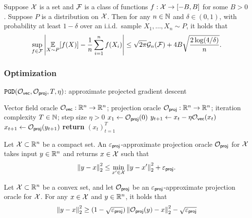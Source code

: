 \begin{lemma} \label{lem:unif-conv}
  Suppose $\mathcal{X}$ is a set and $\mathcal{F}$ is a class of functions $f : \mathcal{X} \to [-B, B]$ for some $B > 0$. Suppose $P$ is a distribution on $\mathcal{X}$. Then for any $n \in \mathbb{N}$ and $\delta \in (0,1)$, with probability at least $1-\delta$ over an i.i.d.~sample $X_1, \ldots, X_n \sim P$, it holds that\loose
  \begin{align}
\sup_{f \in \mathcal{F}} \left| \operatorname*{\mathbb{E}}_{X \sim P}[f(X)] - \frac 1n \sum_{i=1}^n f(X_i) \right| \leq \sqrt{2\pi}\mathcal{G}_n(\mathcal{F}) + 4B\sqrt{\frac{2 \log(4/\delta)}{n}}.\nonumber
  \end{align}
\end{lemma}

\subsubsection{Optimization}

\begin{algorithm}
\caption{$\texttt{PGD}(\mathcal{O}_{\mathsf{vec}},\mathcal{O}_{\mathsf{proj}},T,\eta)$: approximate projected gradient descent}\label{alg:pgd}
\begin{algorithmic}
\Require Vector field oracle $\mathcal{O}_{\mathsf{vec}}: \mathbb{R}^n \to \mathbb{R}^n$; projection oracle $\mathcal{O}_{\mathsf{proj}}: \mathbb{R}^n \to \mathbb{R}^n$; iteration complexity $T \in \mathbb{N}$; step size $\eta>0$
\State $x_1 \gets \mathcal{O}_{\mathsf{proj}}(0)$
    \State $y_{t+1} \gets x_t - \eta \mathcal{O}_{\mathsf{vec}}(x_t)$
    \State $x_{t+1} \gets \mathcal{O}_{\mathsf{proj}}(y_{t+1})$
\EndFor
\State \textbf{return} $(x_t)_{t=1}^T$
\end{algorithmic}
\end{algorithm}

\begin{definition}
Let $\mathcal{X} \subset \mathbb{R}^n$ be a compact set. An $\varepsilon_{\mathsf{proj}}$-approximate projection oracle $\mathcal{O}_{\mathsf{proj}}$ for $\mathcal{X}$ takes input $y \in \mathbb{R}^n$ and returns $x \in \mathcal{X}$ such that
\[\left \lVert y-x \right \rVert_2^2 \leq \min_{x' \in \mathcal{X}} \left \lVert y-x' \right \rVert_2^2 + \varepsilon_{\mathsf{proj}}.\]
\end{definition}

\begin{lemma}\label{lemma:apx-proj-pythag}
Let $\mathcal{X} \subset \mathbb{R}^n$ be a convex set, and let $\mathcal{O}_{\mathsf{proj}}$ be an $\varepsilon_{\mathsf{proj}}$-approximate projection oracle for $\mathcal{X}$. For any $x \in \mathcal{X}$ and $y \in \mathbb{R}^n$, it holds that 
\[\left \lVert y - x \right \rVert_2^2 \geq (1-\sqrt{\varepsilon_{\mathsf{proj}}})\left \lVert \mathcal{O}_{\mathsf{proj}}(y)-x \right \rVert_2^2 - \sqrt{\varepsilon_{\mathsf{proj}}}\]
\end{lemma}

